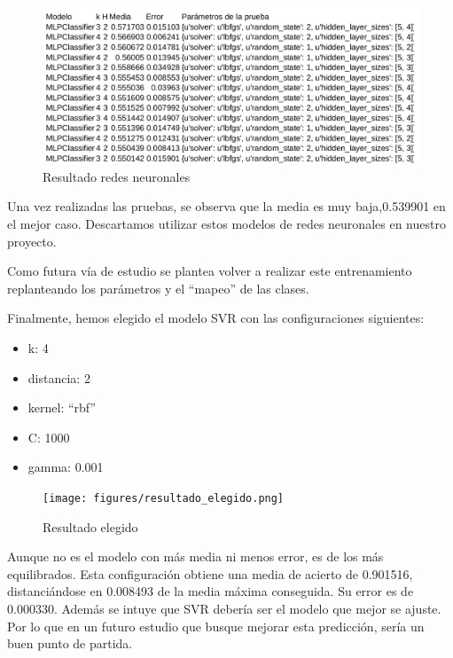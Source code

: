 \begin{figure}[htb]
	\begin{center}
		\includegraphics[width=14cm]{figures/resultado_mlp.png}
		\caption{Resultado redes neuronales \label{resultado_mlp}}
	\end{center}
\end{figure}

Una vez realizadas las pruebas, se observa que la media es muy baja,0.539901 en el mejor caso. Descartamos utilizar estos modelos de redes neuronales en nuestro proyecto.

Como futura vía de estudio se plantea volver a realizar este entrenamiento replanteando los parámetros y el ``mapeo'' de las clases.

Finalmente, hemos elegido el modelo SVR con las configuraciones siguientes:

\begin{itemize}
	\item k: 4
	\item distancia: 2
	\item kernel: ``rbf''
	\item C: 1000
	\item gamma: 0.001
\end{itemize}

\begin{figure}[htb]
	\begin{center}
		\texttt{[image: figures/resultado\_elegido.png]}
		\caption{Resultado elegido \label{resultado_elegido}}
	\end{center}
\end{figure}

Aunque no es el modelo con más media ni menos error, es de los más equilibrados. Esta configuración obtiene una media de acierto de 0.901516, distanciándose en 0.008493 de la media máxima conseguida. Su error es de 0.000330. Además se intuye que SVR debería ser el modelo que mejor se ajuste. Por lo que en un futuro estudio que busque mejorar esta predicción, sería un buen punto de partida.

